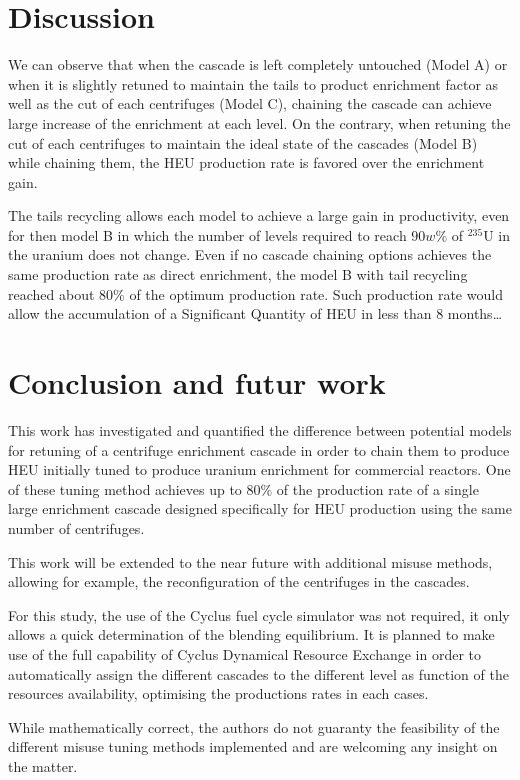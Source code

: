 \section{Discussion}

We can observe that when the cascade is left completely untouched (Model A) or
when it is slightly retuned to maintain the tails to product enrichment factor
as well as the cut of each centrifuges (Model C), chaining the cascade can
achieve large increase of the enrichment at each level.  On the contrary, when
retuning the cut of each centrifuges to maintain the ideal state of the cascades
(Model B) while chaining them, the \gls{HEU} production rate is favored over the
enrichment gain.

The tails recycling allows each model to achieve a large gain in productivity,
even for then model B in which the number of levels required to reach $90w\%$ of
$^{235}$U in the uranium does not change. Even if no cascade chaining options
achieves the same production rate as direct enrichment, the model B with tail
recycling reached about $80\%$ of the optimum production rate. Such production
rate would allow the accumulation of a Significant Quantity of \gls{HEU} in less
than 8 months\ldots


\section{Conclusion and futur work}

This work has investigated and quantified the difference between potential
models for retuning of a centrifuge enrichment cascade in order to chain them to produce
\gls{HEU} initially tuned to produce uranium enrichment for commercial reactors.
One of these tuning method achieves up to $80\%$ of the production rate of a single
large enrichment cascade designed specifically for \gls{HEU} production using
the same number of centrifuges.

This work will be extended to the near future with additional misuse methods,
allowing for example, the reconfiguration of the centrifuges in the cascades.

For this study, the use of the Cyclus fuel cycle simulator was not
required, it only allows a quick determination of the blending equilibrium. It
is planned to make use of the full capability of Cyclus Dynamical Resource Exchange 
in order to automatically assign the different cascades to the different level
as function of the resources availability, optimising the productions rates in
each cases.

While mathematically correct, the authors do not guaranty the feasibility of the
different misuse tuning methods implemented and are welcoming any insight on the
matter.


